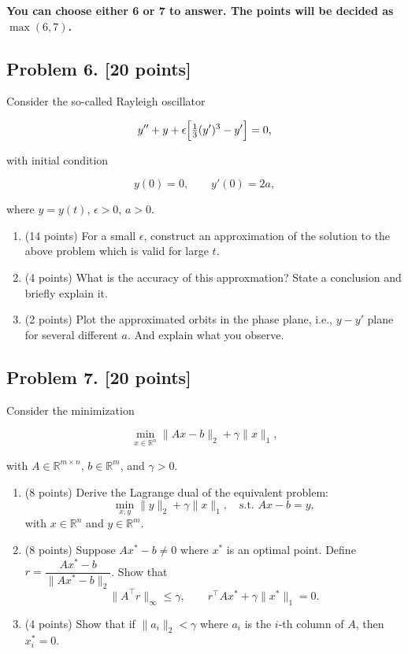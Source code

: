 \documentclass[11pt,a4paper]{article}
\begin{document}


\noindent\textbf{You can choose either 6 or 7 to answer. The points will be decided as \(\max(6, 7)\).}

\subsection{Problem 6. [20 points]}
Consider the so-called Rayleigh oscillator

\[
y'' + y + \epsilon\Bigl[\tfrac13 (y')^{3} - y'\Bigr] = 0,
\]

with initial condition

\[
y(0) = 0,\qquad y'(0) = 2a,
\]

where \(y = y(t)\), \(\epsilon > 0\), \(a > 0\).
\begin{enumerate}[label=(\alph*)]
    \item (14 points) For a small \(\epsilon\), construct an approximation of the solution to the above problem which is valid for large \(t\).
    \item (4 points) What is the accuracy of this approxmation? State a conclusion and briefly explain it.
    \item (2 points) Plot the approximated orbits in the phase plane, i.e., \(y - y'\) plane for several different \(a\). And explain what you observe.
\end{enumerate}



\subsection{Problem 7. [20 points]}
Consider the minimization

\[
\min_{x \in \mathbb{R}^{n}} \|Ax - b\|_{2} + \gamma \|x\|_{1},
\]

with \(A \in \mathbb{R}^{m \times n}\), \(b \in \mathbb{R}^{m}\), and \(\gamma > 0\).
\begin{enumerate}[label=(\alph*)]
    \item (8 points) Derive the Lagrange dual of the equivalent problem:
    \[
    \min_{x,y} \|y\|_{2} + \gamma \|x\|_{1}, \quad \text{s.t. } Ax - b = y,
    \]
    with \(x \in \mathbb{R}^{n}\) and \(y \in \mathbb{R}^{m}\).
    \item (8 points) Suppose \(Ax^{*} - b \neq 0\) where \(x^{*}\) is an optimal point. Define \(r = \dfrac{Ax^{*} - b}{\|Ax^{*} - b\|_{2}}\). Show that
    \[
    \|A^{\top} r\|_{\infty} \le \gamma, \qquad r^{\top} A x^{*} + \gamma \|x^{*}\|_{1} = 0.
    \]
    \item (4 points) Show that if \(\|a_{i}\|_{2} < \gamma\) where \(a_{i}\) is the \(i\)-th column of \(A\), then \(x^{*}_{i} = 0\).
\end{enumerate}
\end{document}
